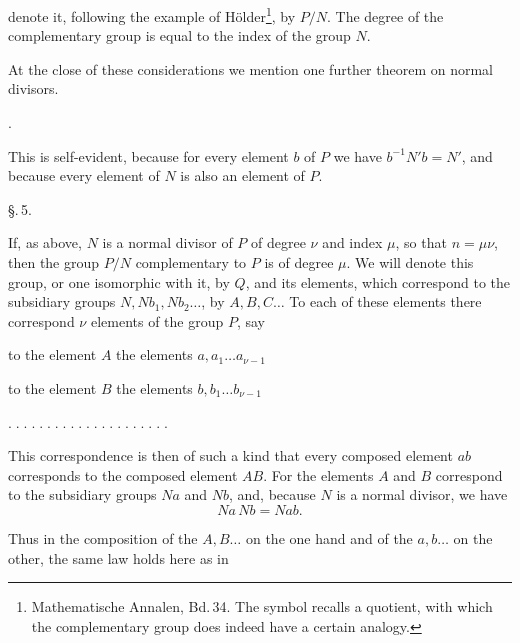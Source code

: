 

denote it, following the example of Hölder\footnote{Mathematische Annalen, Bd.\,34. The symbol recalls a quotient, with which the complementary group does indeed have a certain analogy.}, by $P/N$. The degree of the complementary group is equal to the index of the group $N$.

At the close of these considerations we mention one further theorem on normal divisors.

.\ 

This is self-evident, because for every element $b$ of $P$ we have $b^{-1}N'b = N'$, and because every element of $N$ is also an element of $P$.


\begin{center}
\S.\,5.

\end{center}

If, as above, $N$ is a normal divisor of $P$ of degree $\nu$ and index $\mu$, so that $n = \mu \nu$, then the group $P/N$ complementary to $P$ is of degree $\mu$. We will denote this group, or one isomorphic with it, by $Q$, and its elements, which correspond to the subsidiary groups $N, Nb_1, Nb_2 \dots$, by $A, B, C \dots$ To each of these elements there correspond $\nu$ elements of the group $P$, say

\noindent to the element $A$ the elements $a, a_1 \dots a_{\nu-1}$

\noindent to the element $B$ the elements $b, b_1 \dots b_{\nu-1}$

\noindent $. \; . \; . \; . \; . \; . \; . \; . \; . \; . \; . \; . \; . \; . \; . \; . \; . \; . \; . \; . \; .$

This correspondence is then of such a kind that every composed element $ab$ corresponds to the composed element $AB$. For the elements $A$ and $B$ correspond to the subsidiary groups $Na$ and $Nb$, and, because $N$ is a normal divisor, we have
\[
Na \, Nb = Nab.
\]

Thus in the composition of the $A, B \dots$ on the one hand and of the $a, b \dots$ on the other, the same law holds here as in
